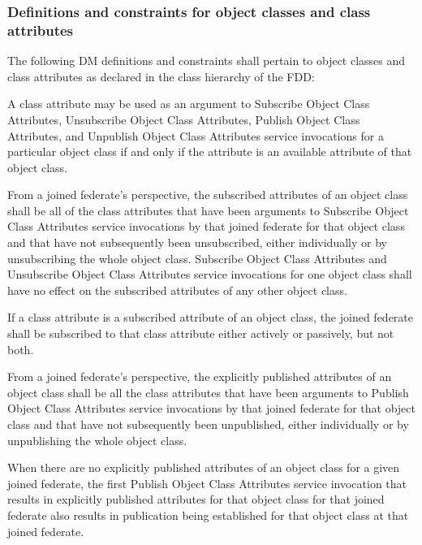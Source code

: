 \clearpage

\begin{compactstdpage}
    \subsubsection{Definitions and constraints for object classes and class attributes}

    The following DM definitions and constraints shall pertain to object classes and class attributes as declared in the class hierarchy of the FDD:

    \begin{stdalphalist}
        \item A class attribute may be used as an argument to Subscribe Object Class Attributes, Unsubscribe Object Class Attributes, Publish Object Class Attributes, and Unpublish Object Class Attributes service invocations for a particular object class if and only if the attribute is an available attribute of that object class.
        \item From a joined federate's perspective, the subscribed attributes of an object class shall be all of the class attributes that have been arguments to Subscribe Object Class Attributes service invocations by that joined federate for that object class and that have not subsequently been unsubscribed, either individually or by unsubscribing the whole object class. Subscribe Object Class Attributes and Unsubscribe Object Class Attributes service invocations for one object class shall have no effect on the subscribed attributes of any other object class.
        \item If a class attribute is a subscribed attribute of an object class, the joined federate shall be subscribed to that class attribute either actively or passively, but not both.
        \item From a joined federate's perspective, the explicitly published attributes of an object class shall be all the class attributes that have been arguments to Publish Object Class Attributes service invocations by that joined federate for that object class and that have not subsequently been unpublished, either individually or by unpublishing the whole object class.
        \item When there are no explicitly published attributes of an object class for a given joined federate, the first Publish Object Class Attributes service invocation that results in explicitly published attributes for that object class for that joined federate also results in publication being established for that object class at that joined federate.

\end{stdalphalist}
\end{compactstdpage}
